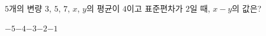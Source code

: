 $5$개의 변량 $3$, $5$, $7$, $x$, $y$의 평균이 $4$이고 표준편차가 $2$일 때, $x-y$의 값은? 
\begin{choices32}{$-5$}{$-4$}{$-3$}{$-2$}{$-1$}\end{choices32}
